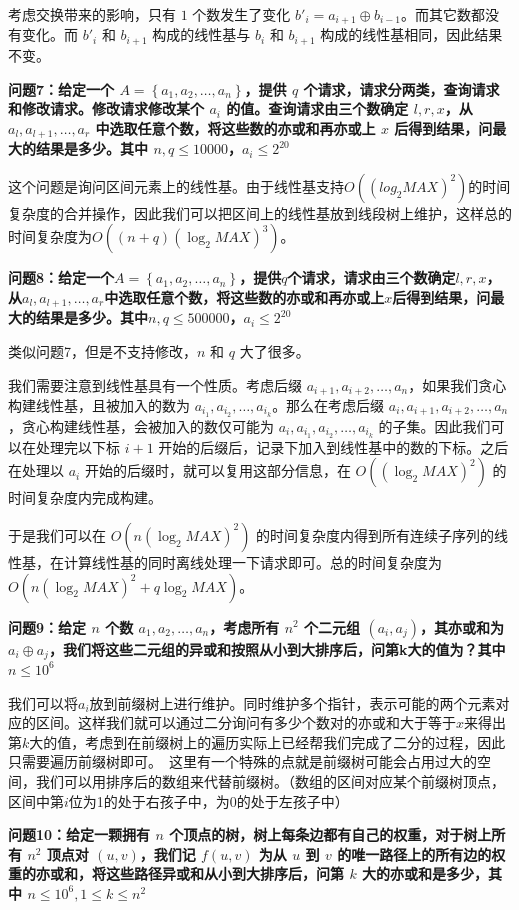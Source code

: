 \documentclass[UTF8, twoside]{ctexart}
\begin{document}
\begin{sloppypar}
考虑交换带来的影响，只有 $1$ 个数发生了变化 $b'_i=a_{i+1}\oplus b_{i-1}$。而其它数都没有变化。而 $b'_i$ 和 $b_{i+1}$ 构成的线性基与 $b_i$ 和 $b_{i+1}$ 构成的线性基相同，因此结果不变。

\textbf{问题7：给定一个 $A=\left\{a_1,a_2,\ldots, a_n\right\}$，提供 $q$ 个请求，请求分两类，查询请求和修改请求。修改请求修改某个 $a_i$ 的值。查询请求由三个数确定 $l,r,x$，从 $a_l,a_{l+1},\ldots, a_r$ 中选取任意个数，将这些数的亦或和再亦或上 $x$ 后得到结果，问最大的结果是多少。其中 $n,q\leq 10000$，$a_i\leq 2^{20}$}

这个问题是询问区间元素上的线性基。由于线性基支持$O((log_2MAX)^2)$的时间复杂度的合并操作，因此我们可以把区间上的线性基放到线段树上维护，这样总的时间复杂度为$O((n+q)(\log_2MAX)^3)$。

\textbf{问题8：给定一个$A=\left\{a_1,a_2,\ldots, a_n\right\}$，提供$q$个请求，请求由三个数确定$l,r,x$，从$a_l,a_{l+1},\ldots, a_r$中选取任意个数，将这些数的亦或和再亦或上$x$后得到结果，问最大的结果是多少。其中$n,q\leq 500000$，$a_i\leq 2^{20}$}

类似问题7，但是不支持修改，$n$ 和 $q$ 大了很多。

我们需要注意到线性基具有一个性质。考虑后缀 $a_{i+1},a_{i+2},\ldots, a_n$，如果我们贪心构建线性基，且被加入的数为 $a_{i_1},a_{i_2},\ldots, a_{i_k}$。那么在考虑后缀 $a_i,a_{i+1},a_{i+2},\ldots, a_n$，贪心构建线性基，会被加入的数仅可能为 $a_i,a_{i_1},a_{i_2},\ldots, a_{i_k}$ 的子集。因此我们可以在处理完以下标 $i+1$ 开始的后缀后，记录下加入到线性基中的数的下标。之后在处理以 $a_i$ 开始的后缀时，就可以复用这部分信息，在 $O((\log_2MAX)^2)$ 的时间复杂度内完成构建。

于是我们可以在 $O(n(\log_2MAX)^2)$ 的时间复杂度内得到所有连续子序列的线性基，在计算线性基的同时离线处理一下请求即可。总的时间复杂度为 $O(n(\log_2MAX)^2+q\log_2MAX)$。

\textbf{问题9：给定 $n$ 个数 $a_1,a_2,\ldots, a_n$，考虑所有 $n^2$ 个二元组 $(a_i,a_j)$，其亦或和为 $a_i\oplus a_j$，我们将这些二元组的异或和按照从小到大排序后，问第k大的值为？其中 $n\leq 10^6$}

我们可以将$a_i$放到前缀树上进行维护。同时维护多个指针，表示可能的两个元素对应的区间。这样我们就可以通过二分询问有多少个数对的亦或和大于等于$x$来得出第$k$大的值，考虑到在前缀树上的遍历实际上已经帮我们完成了二分的过程，因此只需要遍历前缀树即可。\
这里有一个特殊的点就是前缀树可能会占用过大的空间，我们可以用排序后的数组来代替前缀树。（数组的区间对应某个前缀树顶点，区间中第$i$位为1的处于右孩子中，为0的处于左孩子中）

\textbf{问题10：给定一颗拥有 $n$ 个顶点的树，树上每条边都有自己的权重，对于树上所有 $n^2$ 顶点对 $(u,v)$，我们记 $f(u,v)$ 为从 $u$ 到 $v$ 的唯一路径上的所有边的权重的亦或和，将这些路径异或和从小到大排序后，问第 $k$ 大的亦或和是多少，其中 $n\leq 10^6, 1\leq k\leq n^2$}


\end{sloppypar}
\end{document}
